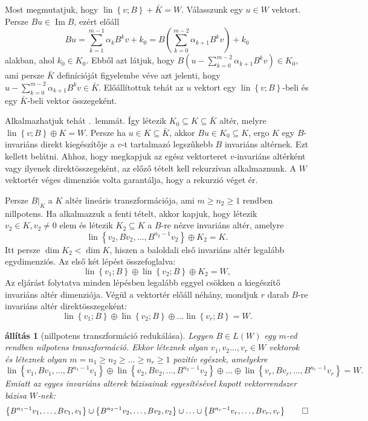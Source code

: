 \documentclass[9pt, a4paper, showtrims]{memoir}
\makeatletter
\renewenvironment{proof}[1][\proofname]
    {\par\pushQED{\qed}%
    \normalfont \topsep6\p@\@plus6\p@\relax
    \trivlist
    \item[\hskip\labelsep
        \itshape
    #1\@addpunct{:}]\ignorespaces}
    {\popQED\endtrivlist\@endpefalse}
\theoremstyle{plain}
\newtheorem{proposition}{állítás}[chapter]
\theoremstyle{remark}
\theoremstyle{definition}
\DeclareMathOperator{\lin}{lin}
\DeclareMathOperator{\im}{Im}
\makeatother
\begin{document}
\begin{proof}
    Most megmutatjuk, hogy $\lin\left\{ v;B \right\}+\bar{K}=W$.
    Válasszunk egy $u\in W$ vektort.
    Persze $Bu\in\im B$, ezért előáll
    \[
        Bu
        =
        \sum_{k=1}^{m-1}\alpha_kB^kv +k_0
        =
        B\left( 
        \sum_{k=0}^{m-2}\alpha_{k+1}B^kv
        \right)
        + k_0
    \]
    alakban, ahol $k_0\in K_0$.
    Ebből azt látjuk, hogy 
    $
    B
    \left( 
    u-
    \sum_{k=0}^{m-2}\alpha_{k+1}B^kv
    \right)
    \in
    K_0,
    $
    ami persze $\bar{K}$ definícióját figyelembe véve azt jelenti, hogy
    \(
    u-
    \sum_{k=0}^{m-2}\alpha_{k+1}B^kv
    \in
    \bar{K}.
    \)
    Előállítottuk tehát az $u$ vektort egy $\lin\left\{ v;B \right\}$-beli és egy 
    $\bar{K}$-beli vektor összegeként.

    Alkalmazhatjuk tehát .~lemmát.
    Így létezik $K_0\subseteq K\subseteq\bar{K}$ altér, melyre $\lin\left\{ v;B \right\}\oplus K=W.$
    Persze ha $u\in K\subseteq\bar{K}$, akkor $Bu\in K_0\subseteq K$, ergo $K$ egy $B$-invariáns direkt kiegészítője a
    $v$-t tartalmazó legszűkebb $B$ invariáns altérnek.
    Ezt kellett belátni. 
\end{proof}
Ahhoz, hogy megkapjuk az egész vektorteret $v$-invariáns altérként vagy ilyenek direktösszegeként, az előző tételt
kell rekurzívan alkalmaznunk.
A $W$ vektortér véges dimenziós volta garantálja, hogy a rekurzió véget ér.

Persze $B|_K$ a $K$ altér lineáris transzformációja, 
ami $m\geq n_2\geq 1$ rendben nillpotens.
Ha alkalmazzuk a fenti tételt, akkor kapjuk, 
hogy létezik $v_2\in K, v_2\neq 0$ elem és létezik $K_2\subseteq K$ a $B$-re nézve invariáns altér,
amelyre
\[
    \lin\left\{ v_2,Bv_2,\dots,B^{n_2-1}v_2 \right\}
    \oplus
    K_2=K.
\]
Itt persze $\dim K_2<\dim K$, hiszen a baloldali első invariáns altér legalább egydimenziós.
Az első két lépést összefoglalva:
\[
    \lin\left\{ v_1;B \right\}
    \oplus
    \lin\left\{ v_2;B \right\}
    \oplus
    K_2=W,
\]
Az eljárást folytatva minden lépésben legalább eggyel csökken a kiegészítő invariáns altér dimenziója.
Végül a vektortér előáll néhány, mondjuk $r$ darab $B$-re invariáns altér direktösszegeként:
\[
    \lin\left\{ v_1;B \right\}
    \oplus
    \lin\left\{ v_2;B \right\}
    \oplus
    \ldots
    \lin\left\{ v_r;B \right\}
    =W.
\]
\begin{proposition}[nillpotens transzformáció redukálása]
    Legyen $B\in L\left( W \right)$ egy $m$-ed rendben nilpotens transzformáció.
    Ekkor léteznek olyan $v_1,v_2\dots,v_r\in W$ vektorok és 
    léteznek olyan $m=n_1\geq n_2\geq \dots\geq n_r\geq 1$ pozitív egészek,
    amelyekre
    \[
        \lin\left\{ v_1,Bv_1,\dots,B^{n_1-1}v_1 \right\}
        \oplus
        \lin\left\{ v_2,Bv_2,\dots,B^{n_2-1}v_2 \right\}
        \oplus
        \ldots
        \oplus
        \lin\left\{ v_r,Bv_r,\dots,B^{n_r-1}v_r \right\}
        =
        W.
    \]
    Emiatt az egyes invariáns alterek bázisainak egyesítésével kapott vektorrendszer bázisa $W$-nek:
    \[
        \left\{ B^{n_1-1}v_1,\dots,Bv_1,v_1 \right\}
        \cup
        \left\{ B^{n_2-1}v_2,\dots,Bv_2,v_2 \right\}
        \cup
        \ldots
        \cup
        \left\{ B^{n_r-1}v_r,\dots,Bv_r,v_r \right\}
        \qedhere
    \]
\end{proposition}
\end{document}
